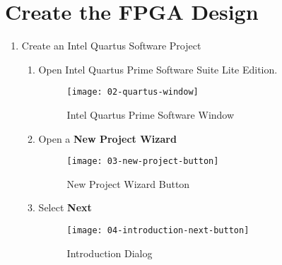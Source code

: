 \newpage

\section*{Create the FPGA Design}

\begin{flushleft}

\begin{enumerate}[
	label=\textbf{Step \arabic*.},
	leftmargin=*,
	widest={00},
	align=left]

\item Create an Intel Quartus Software Project

\begin{enumerate}[
	label=\textbf{Step \arabic{enumi}\alph*.},
	leftmargin=*,
	align=left]

\item Open Intel Quartus Prime Software Suite Lite Edition.

\begin{figure}[H]
\centering
\texttt{[image: 02-quartus-window]}
\caption{Intel Quartus Prime Software Window}
\label{fig:02-quartus-window}
\end{figure}

\item Open a \textbf{New Project Wizard}

\begin{figure}[H]
\centering
\texttt{[image: 03-new-project-button]}
\caption{New Project Wizard Button}
\label{fig:03-new-project-button}
\end{figure}

\newpage

\item Select \textbf{Next}

\begin{figure}[H]
\centering
\texttt{[image: 04-introduction-next-button]}
\caption{Introduction Dialog}
\label{fig:04-introduction-next-button}
\end{figure}


\end{enumerate}
\end{enumerate}
\end{flushleft}
